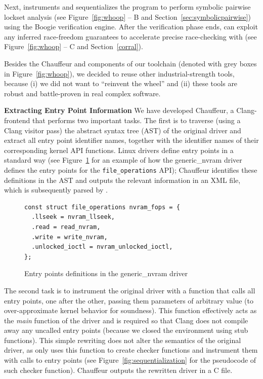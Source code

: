 Next, \whoop instruments and sequentializes the program to perform symbolic pairwise lockset analysis (see Figure~\ref{fig:whoop} -- B and Section~\ref{sec:symbolicpairwise}) using the Boogie verification engine. After the verification phase ends, \whoop can exploit any inferred race-freedom guarantees to accelerate precise race-checking with \corral (see Figure~\ref{fig:whoop} -- C and Section~\ref{corral}).

Besides the Chauffeur and \whoop components of our toolchain (denoted with grey boxes in Figure~\ref{fig:whoop}), we decided to reuse other industrial-strength tools, because (i) we did not want to ``reinvent the wheel'' and (ii) these tools are robust and battle-proven in real complex software.

\medskip\noindent\textbf{Extracting Entry Point Information }
%
We have developed Chauffeur, a Clang-frontend that performs two important tasks. The first is to traverse (using a Clang visitor pass) the abstract syntax tree (AST) of the original driver and extract all entry point identifier names, together with the identifier names of their corresponding kernel API functions. Linux drivers define entry points in a standard way (see Figure~\ref{fig:entrypoints} for an example of how the generic\_nvram driver defines the entry points for the \texttt{file\_operations} API); Chauffeur identifies these definitions in the AST and outputs the relevant information in an XML file, which is subsequently parsed by \whoop.

\begin{figure}[t]
\begin{lstlisting}
const struct file_operations nvram_fops = {
  .llseek = nvram_llseek,
  .read = read_nvram,
  .write = write_nvram,
  .unlocked_ioctl = nvram_unlocked_ioctl,
};
\end{lstlisting}
\caption{Entry points definitions in the generic\_nvram driver}
\label{fig:entrypoints}
\end{figure}

The second task is to instrument the original driver with a function that calls all entry points, one after the other, passing them parameters of arbitrary value (to over-approximate kernel behavior for soundness). This function effectively acts as the \emph{main} function of the driver and is required so that Clang does not compile away any uncalled entry points (because we closed the environment using stub functions). This simple rewriting does not alter the semantics of the original driver, as \whoop only uses this function to create checker functions and instrument them with calls to entry points (see Figure~\ref{fig:sequentialization} for the pseudocode of such checker function). Chauffeur outputs the rewritten driver in a C file.

